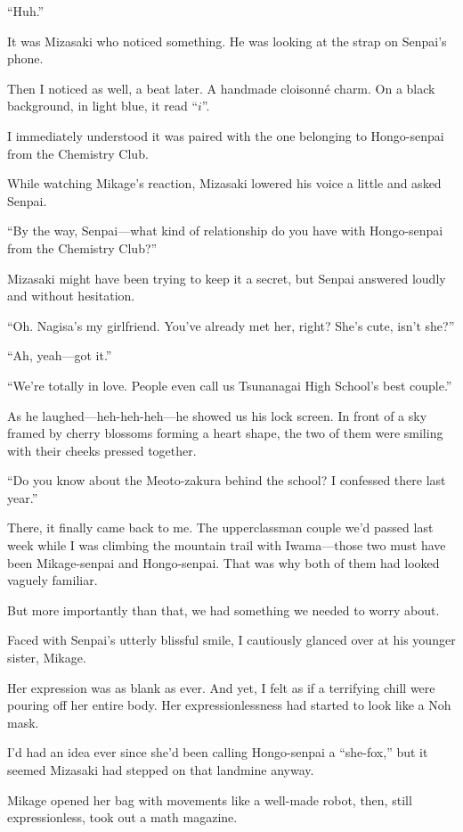 \documentclass[
    a4paper,
    12pt,
    twoside,
    openany,
    UTF8,
    fontset=windows
]{ctexbook}
\begin{document}
``Huh.''

It was Mizasaki who noticed something. He was looking at the strap on Senpai's phone.

Then I noticed as well, a beat later. A handmade cloisonné charm. On a black background, in light blue, it read ``$i$''.

I immediately understood it was paired with the one belonging to Hongo-senpai from the Chemistry Club.

While watching Mikage's reaction, Mizasaki lowered his voice a little and asked Senpai.

``By the way, Senpai---what kind of relationship do you have with Hongo-senpai from the Chemistry Club?''

Mizasaki might have been trying to keep it a secret, but Senpai answered loudly and without hesitation.

``Oh. Nagisa's my girlfriend. You've already met her, right? She's cute, isn't she?''

``Ah, yeah---got it.''

``We're totally in love. People even call us Tsunanagai High School's best couple.''

As he laughed---heh-heh-heh---he showed us his lock screen. In front of a sky framed by cherry blossoms forming a heart shape, the two of them were smiling with their cheeks pressed together.

``Do you know about the Meoto-zakura behind the school? I confessed there last year.''

There, it finally came back to me. The upperclassman couple we'd passed last week while I was climbing the mountain trail with Iwama---those two must have been Mikage-senpai and Hongo-senpai. That was why both of them had looked vaguely familiar.

But more importantly than that, we had something we needed to worry about.

Faced with Senpai's utterly blissful smile, I cautiously glanced over at his younger sister, Mikage.

Her expression was as blank as ever. And yet, I felt as if a terrifying chill were pouring off her entire body. Her expressionlessness had started to look like a Noh mask.

I'd had an idea ever since she'd been calling Hongo-senpai a ``she-fox,'' but it seemed Mizasaki had stepped on that landmine anyway.

Mikage opened her bag with movements like a well-made robot, then, still expressionless, took out a math magazine.
\end{document}
